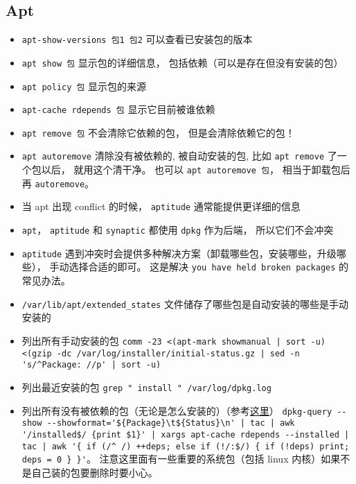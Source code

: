 
\begin{issues}
\issueDraft
\end{issues}

\subsection{Apt}
\begin{itemize}
\item \verb|apt-show-versions 包1 包2| 可以查看已安装包的版本
\item \verb|apt show 包| 显示包的详细信息， 包括依赖（可以是存在但没有安装的包）
\item \verb|apt policy 包| 显示包的来源
\item \verb|apt-cache rdepends 包| 显示它目前被谁依赖
\item \verb|apt remove 包| 不会清除它依赖的包， 但是会清除依赖它的包！
\item \verb|apt autoremove| 清除没有被依赖的, 被自动安装的包, 比如 \verb|apt remove| 了一个包以后， 就用这个清干净。 也可以 \verb|apt autoremove 包|， 相当于卸载包后再 \verb|autoremove|。
\item 当 apt 出现 conflict 的时候， \verb|aptitude| 通常能提供更详细的信息
\item \verb|apt|， \verb|aptitude| 和 \verb|synaptic| 都使用 \verb|dpkg| 作为后端， 所以它们不会冲突
\item \verb|aptitude| 遇到冲突时会提供多种解决方案（卸载哪些包，安装哪些，升级哪些）， 手动选择合适的即可。 这是解决 \verb|you have held broken packages| 的常见办法。
\item \verb|/var/lib/apt/extended_states| 文件储存了哪些包是自动安装的哪些是手动安装的
\item 列出所有手动安装的包 \verb`comm -23 <(apt-mark showmanual | sort -u) <(gzip -dc /var/log/installer/initial-status.gz | sed -n 's/^Package: //p' | sort -u)`
\item 列出最近安装的包 \verb|grep " install " /var/log/dpkg.log|
\item 列出所有没有被依赖的包（无论是怎么安装的）（参考\href{https://askubuntu.com/questions/1114733/how-do-i-list-all-packages-that-no-package-depends-on}{这里}） \verb`dpkg-query --show --showformat='${Package}\t${Status}\n' | tac | awk '/installed$/ {print $1}' | xargs apt-cache rdepends --installed | tac | awk '{ if (/^ /) ++deps; else if (!/:$/) { if (!deps) print; deps = 0 } }'`。 注意这里面有一些重要的系统包（包括 linux 内核）如果不是自己装的包要删除时要小心。

\end{itemize}
